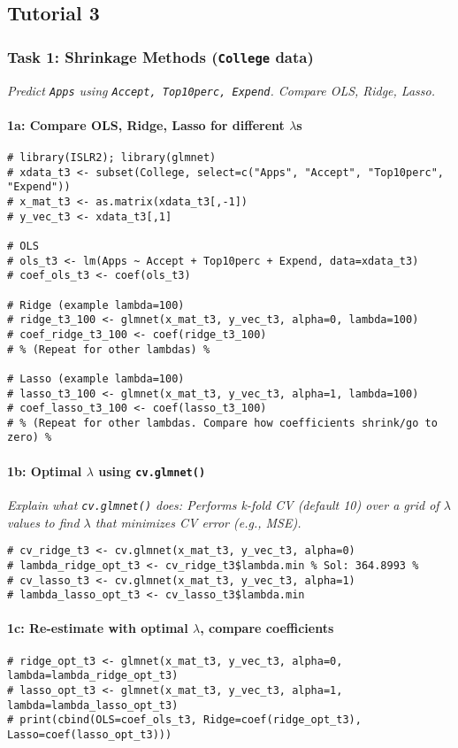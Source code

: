 \documentclass[12pt,a4paper]{article}
\newcommand{\Rfunction}[1]{\texttt{#1()}} %
\newcommand{\Robject}[1]{\texttt{#1}} %
\newcommand{\Rcode}[1]{\texttt{#1}} %
\begin{document}
    \subsection{Tutorial 3 }
        \subsubsection{Task 1: Shrinkage Methods (\Robject{College} data)}
            \textit{Predict \Rcode{Apps} using \Rcode{Accept, Top10perc, Expend}. Compare OLS, Ridge, Lasso.}
            \paragraph{1a: Compare OLS, Ridge, Lasso for different $\lambda$s}
\begin{lstlisting}
# library(ISLR2); library(glmnet)
# xdata_t3 <- subset(College, select=c("Apps", "Accept", "Top10perc", "Expend"))
# x_mat_t3 <- as.matrix(xdata_t3[,-1])
# y_vec_t3 <- xdata_t3[,1]

# OLS
# ols_t3 <- lm(Apps ~ Accept + Top10perc + Expend, data=xdata_t3)
# coef_ols_t3 <- coef(ols_t3)

# Ridge (example lambda=100)
# ridge_t3_100 <- glmnet(x_mat_t3, y_vec_t3, alpha=0, lambda=100)
# coef_ridge_t3_100 <- coef(ridge_t3_100)
# % (Repeat for other lambdas) %

# Lasso (example lambda=100)
# lasso_t3_100 <- glmnet(x_mat_t3, y_vec_t3, alpha=1, lambda=100)
# coef_lasso_t3_100 <- coef(lasso_t3_100)
# % (Repeat for other lambdas. Compare how coefficients shrink/go to zero) %
\end{lstlisting}
            \paragraph{1b: Optimal $\lambda$ using \Rfunction{cv.glmnet}}
                \textit{Explain what \Rfunction{cv.glmnet} does: Performs k-fold CV (default 10) over a grid of $\lambda$ values to find $\lambda$ that minimizes CV error (e.g., MSE).}
\begin{lstlisting}[caption={Optimal Lambda (Ex Set 3, T1b)}]
# cv_ridge_t3 <- cv.glmnet(x_mat_t3, y_vec_t3, alpha=0)
# lambda_ridge_opt_t3 <- cv_ridge_t3$lambda.min % Sol: 364.8993 %
# cv_lasso_t3 <- cv.glmnet(x_mat_t3, y_vec_t3, alpha=1)
# lambda_lasso_opt_t3 <- cv_lasso_t3$lambda.min
\end{lstlisting}
            \paragraph{1c: Re-estimate with optimal $\lambda$, compare coefficients}
\begin{lstlisting}
# ridge_opt_t3 <- glmnet(x_mat_t3, y_vec_t3, alpha=0, lambda=lambda_ridge_opt_t3)
# lasso_opt_t3 <- glmnet(x_mat_t3, y_vec_t3, alpha=1, lambda=lambda_lasso_opt_t3)
# print(cbind(OLS=coef_ols_t3, Ridge=coef(ridge_opt_t3), Lasso=coef(lasso_opt_t3)))
\end{lstlisting}
\end{document}

